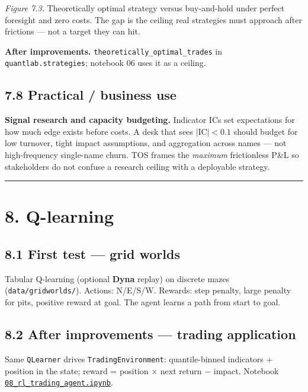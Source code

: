 \documentclass[
  11pt,
]{article}
\begin{document}
\emph{Figure 7.3.} Theoretically optimal strategy versus buy-and-hold
under perfect foresight and zero costs. The gap is the ceiling real
strategies must approach after frictions --- not a target they can hit.

\textbf{After improvements.} \texttt{theoretically\_optimal\_trades} in
\texttt{quantlab.strategies}; notebook 06 uses it as a ceiling.

\subsection{7.8 Practical / business
use}\label{practical-business-use-5}

\textbf{Signal research and capacity budgeting.} Indicator ICs set
expectations for how much edge exists before costs. A desk that sees
\(|\mathrm{IC}| < 0.1\) should budget for low turnover, tight impact
assumptions, and aggregation across names --- not high-frequency
single-name churn. TOS frames the \emph{maximum} frictionless P\&L so
stakeholders do not confuse a research ceiling with a deployable
strategy.

\begin{center}\rule{0.5\linewidth}{0.5pt}\end{center}

\section{8. Q-learning}\label{q-learning}

\subsection{8.1 First test --- grid
worlds}\label{first-test-grid-worlds}

Tabular Q-learning (optional \textbf{Dyna} replay) on discrete mazes
(\texttt{data/gridworlds/}). Actions: N/E/S/W. Rewards: step penalty,
large penalty for pits, positive reward at goal. The agent learns a path
from start to goal.

\subsection{8.2 After improvements --- trading
application}\label{after-improvements-trading-application}

Same \texttt{QLearner} drives \texttt{TradingEnvironment}:
quantile-binned indicators + position in the state; reward = position ×
next return − impact. Notebook
\href{../notebooks/08_rl_trading_agent.ipynb}{\texttt{08\_rl\_trading\_agent.ipynb}}.
\end{document}
